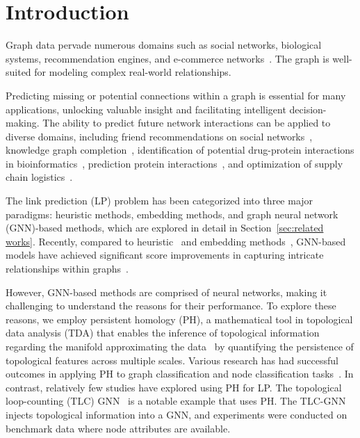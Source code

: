 \section{Introduction}

Graph data pervade numerous domains such as social networks, biological systems, recommendation engines, and e-commerce networks~\cite{zhang2020deep, wu2020comprehensive}.
The graph is well-suited for modeling complex real-world relationships.

Predicting missing or potential connections within a graph is essential for many applications, unlocking valuable insight and facilitating intelligent decision-making. 
The ability to predict future network interactions can be applied to diverse domains, including friend recommendations on social networks~\cite{adamic2003friends, yao2016link, fire2011link}, knowledge graph completion~\cite{kazemi2018simple, nayyeri2021link}, identification of potential drug-protein interactions in bioinformatics~\cite{stanfield2017drug, nasiri2021novel}, prediction protein interactions~\cite{lei2013novel, kovacs2019network, nasiri2021novel}, and optimization of supply chain logistics~\cite{brockmann2022supply, brintrup2018predicting}.

The link prediction (LP) problem has been categorized into three major paradigms: heuristic methods, embedding methods, and graph neural network (GNN)-based methods, which are explored in detail in Section~\ref{sec:related works}.
Recently, compared to heuristic~\cite{adamic2003friends, lu2011link, barabasi1999emergence, zhou2009predicting, brin2012reprint, jeh2002simrank} and embedding methods~\cite{koren2009matrix, perozzi2014deepwalk, grover2016node2vec, tang2015line}, GNN-based models have achieved significant score improvements in capturing intricate relationships within graphs~\cite{kipf2016variational, zhang2018link, yun2021neo, mavromatis2020graph, yan2021link, pan2021neural}. 

However, GNN-based methods are comprised of neural networks, making it challenging to understand the reasons for their performance.
To explore these reasons, we employ persistent homology (PH), a mathematical tool in topological data analysis (TDA) that enables the inference of topological information regarding the manifold approximating the data~\cite{huber2021persistent, dey2022computational} by quantifying the persistence of topological features across multiple scales.
Various research has had successful outcomes in applying PH to graph classification and node classification tasks~\cite{horn2021topological, ye2023treph, carriere2020perslay, taiwo2024explaining, wen2024tensor, immonen2024going, ying2024boosting, zhao2019learning, chen2021topological, zhao2020persistence}.
In contrast, relatively few studies have explored using PH for LP.
The topological loop-counting (TLC) GNN~\cite{yan2021link} is a notable example that uses PH.
The TLC-GNN injects topological information into a GNN, and experiments were conducted on benchmark data where node attributes are available.



